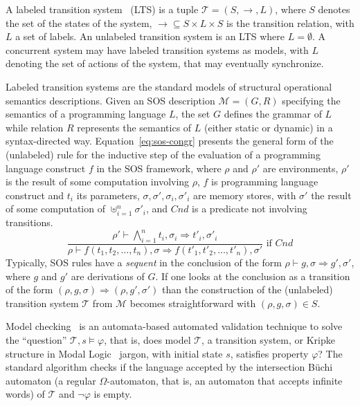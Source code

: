 \documentclass{llncs}%
\begin{document}
A labeled transition system~\cite{arnold1994finite} (LTS) is a tuple $\mathcal{T} = (S, \rightarrow, L)$, where $S$ denotes the set of the states of the system, $\rightarrow \subseteq S \times L \times S$ is the transition relation, with $L$ a set of labels. An unlabeled transition system is an LTS where $L = \emptyset$. A concurrent system may have labeled transition systems as models, with $L$ denoting the set of actions of the system, that may eventually synchronize. 

Labeled transition systems are the standard models of structural operational semantics descriptions. Given an SOS description $\mathcal{M} = (G, R)$ specifying the semantics of a programming language $L$, the set $G$ defines the grammar of $L$ while relation $R$ represents the semantics of $L$ (either static or dynamic) in a syntax-directed way.   
Equation~\ref{eq:sos-congr} presents the general form of the (unlabeled) rule for 
the inductive step of the evaluation of a programming language
construct $f$ in the SOS framework, where $\rho$ and $\rho'$ are environments, $\rho'$ is the result of
some computation involving $\rho$, $f$ is programming language
construct and $t_i$ its parameters,
$\sigma, \sigma', \sigma_i, \sigma'_i$ are memory stores, with
$\sigma'$ the result of some computation of $\uplus^n_{i=1}\sigma'_i$, and
$\mathit{Cnd}$ is a predicate not involving transitions.
\begin{equation}\label{eq:sos-congr}
\frac{\rho' \vdash \bigwedge^n_{i=1} t_i, \sigma_i \Rightarrow t'_i, \sigma'_i}
     {\rho \vdash f(t_1, t_2, \ldots, t_n), \sigma
       \Rightarrow f(t'_1, t'_2, \ldots, t'_n), \sigma'} \mbox{ if } \mathit{Cnd}
\end{equation}
Typically, SOS rules have a \emph{sequent} in the conclusion of the form $\rho \vdash g , \sigma \Rightarrow g' , \sigma'$, where $g$ and $g'$ are derivations of $G$. If one looks at the conclusion as a transition of the form $(\rho, g, \sigma) \Rightarrow (\rho, g', \sigma')$ than the construction of the (unlabeled) transition system $\mathcal{T}$ from $\mathcal{M}$ becomes straightforward with $(\rho, g, \sigma) \in S$.

Model checking~\cite{Clarke:2000:MC:332656} is an automata-based automated validation technique to solve the ``question'' 
$\mathcal{T}, s \models \varphi$, that is, does model $\mathcal{T}$, a transition system, or Kripke structure in Modal Logic~\cite{goldblatt} jargon, with initial state $s$, satisfies property $\varphi$? The standard algorithm checks if the language accepted by the intersection B\"uchi automaton (a regular $\Omega$-automaton, that is, an automaton that accepts infinite words) of $\mathcal{T}$ and $\neg\varphi$ is empty.  
\end{document}
